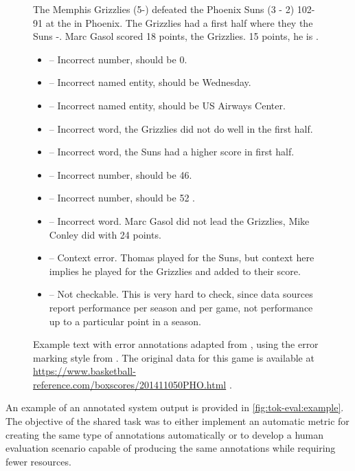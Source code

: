 \begin{figure}[t]
    \footnotesize
    \lineacross{}


    The Memphis Grizzlies (5-) defeated the Phoenix Suns (3 - 2)  102-91 at the  in Phoenix. The Grizzlies had a  first half where they  the Suns -. Marc Gasol scored 18 points,  the Grizzlies.   15 points, he is .
    \vspace{1mm}

    \begin{itemize}
        \item {}                                       -- Incorrect number, should be 0.
        \item {}                                  -- Incorrect named entity, should be Wednesday.
        \item {}              -- Incorrect named entity, should be US Airways Center.
        \item {}                                 -- Incorrect word, the Grizzlies did not do well in the first half.
        \item {}                             -- Incorrect word, the Suns had a higher score in first half.
        \item {}                                      -- Incorrect number, should be 46.
        \item {}                                      -- Incorrect number, should be 52 .
        \item {}                                -- Incorrect word.  Marc Gasol did not lead the Grizzlies, Mike Conley did with 24 points.
        \item {}                     -- Context error.  Thomas played for the Suns, but context here implies he played for the Grizzlies and added to their score.
        \item {} -- Not checkable.  This is very hard to check, since data sources report performance per season and per game, not performance up to a particular point in a season.
    \end{itemize}
    \lineacross{}

    \caption{Example text with error annotations adapted from \citet{thomsonGenerationChallengesResults2021}, using the error marking style from \citet{thomsonEvaluatingFactualAccuracy2023}. The original data for this game is available at \url{https://www.basketball-reference.com/boxscores/201411050PHO.html} .}
    \label{fig:tok-eval:example}
\end{figure}
An example of an annotated system output is provided in \autoref{fig:tok-eval:example}. The objective of the shared task was to either implement an automatic metric for creating the same type of annotations automatically or to develop a human evaluation scenario capable of producing the same annotations while requiring fewer resources.



